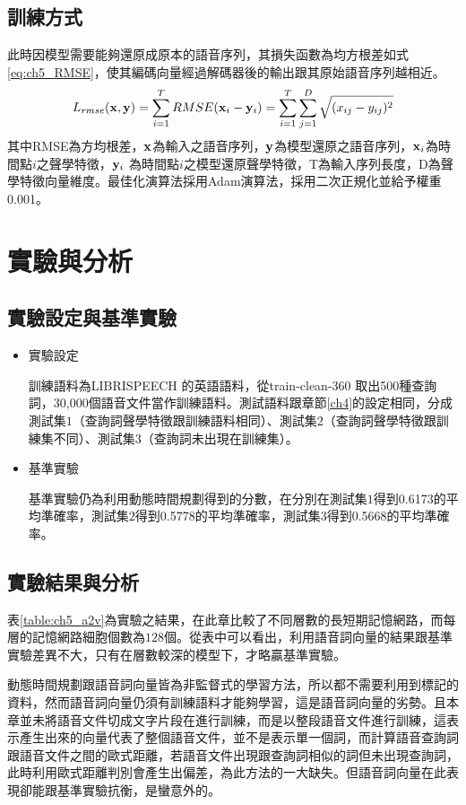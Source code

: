\subsection{訓練方式}
此時因模型需要能夠還原成原本的語音序列，其損失函數為均方根差如式\ref{eq:ch5_RMSE}，使其編碼向量經過解碼器後的輸出跟其原始語音序列越相近。
\begin{equation}
\label{eq:ch5_RMSE}
L_{rmse} (\bold{x},\bold{y}) = \sum_{i=1}^{T}
RMSE(\bold{x}_i-\bold{y}_i) = \sum_{i=1}^{T} \sum_{j=1}^D \sqrt{(x_{ij}-y_{ij})^2}
\end{equation}
其中RMSE為方均根差，$\bold{x}$為輸入之語音序列，$\bold{y}$為模型還原之語音序列，$\bold{x}_i$為時間點$i$之聲學特徵，$\bold{y}_i$
為時間點$i$之模型還原聲學特徵，T為輸入序列長度，D為聲學特徵向量維度。最佳化演算法採用Adam演算法，採用二次正規化並給予權重0.001。

\section{實驗與分析}
\subsection{實驗設定與基準實驗}
\begin{itemize}
\item{實驗設定}

訓練語料為LIBRISPEECH 的英語語料，從train-clean-360
取出500種查詢詞，30,000個語音文件當作訓練語料。測試語料跟章節\ref{ch4}的設定相同，分成測試集$1$（查詢詞聲學特徵跟訓練語料相同）、測試集$2$（查詢詞聲學特徵跟訓練集不同）、測試集$3$（查詢詞未出現在訓練集）。
\item{基準實驗}

基準實驗仍為利用動態時間規劃得到的分數，在分別在測試集$1$得到0.6173的平均準確率，測試集$2$得到0.5778的平均準確率，測試集$3$得到0.5668的平均準確率。
\end{itemize}
\subsection{實驗結果與分析}
表\ref{table:ch5_a2v}為實驗之結果，在此章比較了不同層數的長短期記憶網路，而每層的記憶網路細胞個數為$128$個。從表中可以看出，利用語音詞向量的結果跟基準實驗差異不大，只有在層數較深的模型下，才略贏基準實驗。

動態時間規劃跟語音詞向量皆為非監督式的學習方法，所以都不需要利用到標記的資料，然而語音詞向量仍須有訓練語料才能夠學習，這是語音詞向量的劣勢。且本章並未將語音文件切成文字片段在進行訓練，而是以整段語音文件進行訓練，這表示產生出來的向量代表了整個語音文件，並不是表示單一個詞，而計算語音查詢詞跟語音文件之間的歐式距離，若語音文件出現跟查詢詞相似的詞但未出現查詢詞，此時利用歐式距離判別會產生出偏差，為此方法的一大缺失。但語音詞向量在此表現卻能跟基準實驗抗衡，是蠻意外的。

